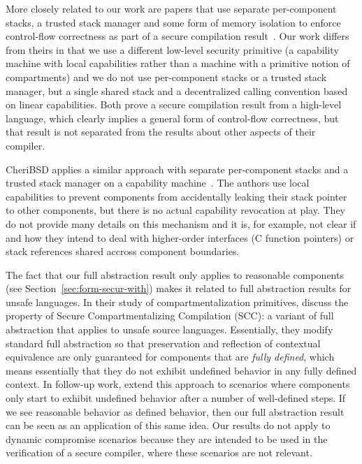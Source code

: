 \documentclass[acmsmall,review,anonymous]{acmart}\settopmatter{printfolios=true,printccs=false,printacmref=false}
\begin{document}
More closely related to our work are papers that use separate per-component stacks, a trusted stack manager and some form of memory isolation to enforce control-flow correctness as part of a secure compilation result~\citep{patrignani_modular_2016,juglaret_beyond_2016}.
Our work differs from theirs in that we use a different low-level security primitive (a capability machine with local capabilities rather than a machine with a primitive notion of compartments) and we do not use per-component stacks or a trusted stack manager, but a single shared stack and a decentralized calling convention based on linear capabilities.
Both prove a secure compilation result from a high-level language, which clearly implies a general form of control-flow correctness, but that result is not separated from the results about other aspects of their compiler.

CheriBSD applies a similar approach with separate per-component stacks and a trusted stack manager on a capability machine~\cite{watson_cheri:_2015}.
The authors use local capabilities to prevent components from accidentally leaking their stack pointer to other components, but there is no actual capability revocation at play.
They do not provide many details on this mechanism and it is, for example, not clear if and how they intend to deal with higher-order interfaces (C function pointers) or stack references shared accross component boundaries. 

The fact that our full abstraction result only applies to reasonable components (see Section~\ref{sec:form-secur-with}) makes it related to full abstraction results for unsafe languages.
In their study of compartmentalization primitives,  discuss the property of Secure Compartmentalizing Compilation (SCC): a variant of full abstraction that applies to unsafe source languages.
Essentially, they modify standard full abstraction so that preservation and reflection of contextual equivalence are only guaranteed for components that are {\itshape fully defined}, which means essentially that they do not exhibit undefined behavior in any fully defined context.
In follow-up work, \citet{DBLP:journals/corr/abs-1802-00588} extend this approach to scenarios where components only start to exhibit undefined behavior after a number of well-defined steps.
If we see reasonable behavior as defined behavior, then our full abstraction result can be seen as an application of this same idea.
Our results do not apply to dynamic compromise scenarios because they are intended to be used in the verification of a secure compiler, where these scenarios are not relevant.





\end{document}
